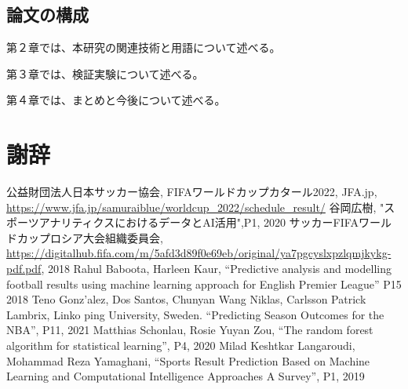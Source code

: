 \documentclass[platex]{suribt}
\begin{document}
\section{論文の構成}
第２章では、本研究の関連技術と用語について述べる。\par
第３章では、検証実験について述べる。\par
第４章では、まとめと今後について述べる。


\backmatter%
\chapter{謝辞}%

\begin{thebibliography}{2}%
公益財団法人日本サッカー協会, FIFAワールドカップカタール2022, JFA.jp, \url{https://www.jfa.jp/samuraiblue/worldcup_2022/schedule_result/}
谷岡広樹, "スポーツアナリティクスにおけるデータとAI活用",P1, 2020
サッカーFIFAワールドカップロシア大会組織委員会,  \url{https://digitalhub.fifa.com/m/5afd3d89f0e69eb/original/ya7pgcyslxpzlqmjkykg-pdf.pdf}, 2018
Rahul Baboota, Harleen Kaur, “Predictive analysis and modelling football results using machine learning approach for English Premier League” P15 2018
Teno Gonz'alez, Dos Santos, Chunyan Wang Niklas, Carlsson Patrick Lambrix, Linko ping University, Sweden. “Predicting Season Outcomes for the NBA”, P11, 2021
Matthias Schonlau, Rosie Yuyan Zou, “The random forest algorithm for statistical learning”, P4, 2020
Milad Keshtkar Langaroudi, Mohammad Reza Yamaghani, “Sports Result Prediction Based on Machine Learning and Computational Intelligence Approaches A Survey”, P1, 2019


\end{thebibliography}
\appendix%
\chapter{}
\end{document}
